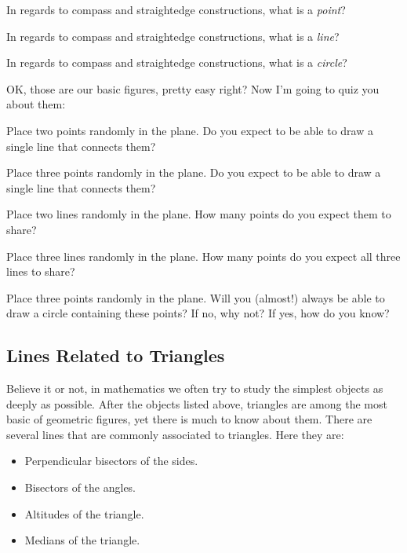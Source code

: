\begin{ques} 
In regards to compass and straightedge constructions, what is a
\textit{point}?
\end{ques}
\QM

\begin{ques}
In regards to compass and straightedge constructions, what is a
\textit{line}?
\end{ques}
\QM


\begin{ques}
In regards to compass and straightedge constructions, what is a
\textit{circle}?
\end{ques}
\QM


OK, those are our basic figures, pretty easy right? Now I'm going to
quiz you about them:

\begin{ques} 
Place two points randomly in the plane. Do you expect to be able to
draw a single line that connects them?
\end{ques}
\QM

\begin{ques} 
Place three points randomly in the plane. Do you expect to be able to
draw a single line that connects them?
\end{ques}
\QM

\begin{ques} 
Place two lines randomly in the plane. How many points do you expect
them to share?
\end{ques}
\QM


\begin{ques} 
Place three lines randomly in the plane. How many points do you expect
all three lines to share?
\end{ques}
\QM


\begin{ques} 
Place three points randomly in the plane. Will you (almost!) always be
able to draw a circle containing these points? If no, why not? If yes,
how do you know?
\end{ques}
\QM




\subsection{Lines Related to Triangles}

Believe it or not, in mathematics we often try to study the simplest
objects as deeply as possible. After the objects listed above,
triangles are among the most basic of geometric figures, yet there is
much to know about them.  There are several lines that are commonly
associated to triangles. Here they are:
\begin{itemize}
\item Perpendicular bisectors of the sides.
\item Bisectors of the angles.
\item Altitudes of the triangle.
\item Medians of the triangle. 
\end{itemize}


